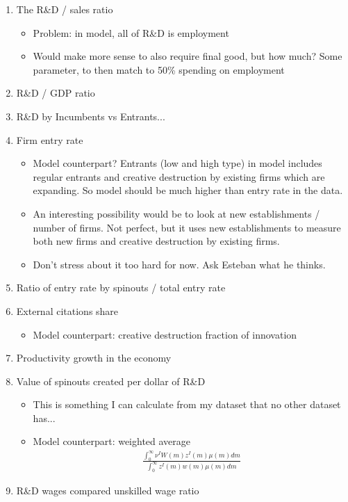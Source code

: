 \documentclass[12pt,english]{article}
\theoremstyle{remark}
\begin{document}
\begin{enumerate}
	\item The R\&D / sales ratio
	\begin{itemize}
		\item Problem: in model, all of R\&D is employment
		\item Would make more sense to also require final good, but how much? Some parameter, to then match to 50\% spending on employment
	\end{itemize}
	\item R\&D / GDP ratio
	\item R\&D by Incumbents vs Entrants...
	\item Firm entry rate
	\begin{itemize}
		\item Model counterpart? Entrants (low and high type) in model includes regular entrants and creative destruction by existing firms which are expanding. So model should be much higher than entry rate in the data.
		\item An interesting possibility would be to look at new establishments / number of firms. Not perfect, but it uses new establishments to measure both new firms and creative destruction by existing firms. 
		\item Don't stress about it too hard for now. Ask Esteban what he thinks.
	\end{itemize}
	\item Ratio of entry rate by spinouts / total entry rate
	\item External citations share
	\begin{itemize}
		\item Model counterpart: creative destruction fraction of innovation
	\end{itemize}
	\item Productivity growth in the economy
	\item Value of spinouts created per dollar of R\&D
	\begin{itemize}
		\item This is something I can calculate from my dataset that no other dataset has...
		\item Model counterpart: weighted average
		\begin{align*}
			\frac{\int_0^{\infty} \nu^I W(m) z^I(m) \mu(m) dm}{\int_0^{\infty} z^I(m) w(m) \mu(m) dm}
		\end{align*}
	\end{itemize}
	\item R\&D wages compared unskilled wage ratio

\end{enumerate}
\end{document}

